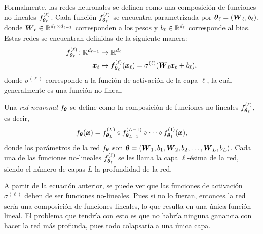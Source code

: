 {{%



Formalmente, las redes neuronales se definen como una composición de funciones no-lineales $f^{(\ell)}_{\vb*{\theta}_\ell}$. Cada función $f^{(\ell)}_{\vb*{\theta}_\ell}$ se encuentra parametrizada por $\vb*{\theta}_\ell = (\vb*{W}_\ell, b_\ell)$, donde $\vb*{W}_\ell \in \mathbb{R}^{d_{\ell} \times d_{\ell-1}}$ corresponden a los pesos y $b_\ell \in \mathbb{R}^{d_\ell}$ corresponde al bias. Estas redes se encuentran definidas de la siguiente manera:
\begin{align*}
    f^{(\ell)}_{\vb*{\theta}_\ell} \colon \mathbb{R}^{d_{\ell-1}} & \to \mathbb{R}^{d_\ell}                                                                         \\
    \vb*{x}_\ell                                      & \mapsto f^{(\ell)}_{\vb*{\theta}_\ell}(\vb*{x}_\ell) = \sigma^{(\ell)}(\vb*{W}_\ell \vb*{x}_\ell + b_\ell),
\end{align*}
donde $\sigma^{(\ell)}$ corresponde a la función de activación de la capa $\ell$, la cuál generalmente es una función no-lineal.

Una \emph{red neuronal} $f_{\vb*{\theta}}$ se define como la composición de funciones no-lineales $f^{(\ell)}_{\vb*{\theta}_{\ell}}$,
es decir,
\begin{equation}
    f_{\vb*{\theta}}(\vb*{x}) = f^{(L)}_{\vb*{\theta}_{L}} \circ f^{(L-1)}_{\vb*{\theta}_{L-1}} \circ \cdots \circ f^{(1)}_{\vb*{\theta}_{1}}(\vb*{x}),
\end{equation}
donde los parámetros de la red $f_{\vb*{\theta}}$ son $\vb*{\theta} = (\vb*{W}_1, b_1, \vb*{W}_2, b_2, \ldots, \vb*{W}_L, b_L)$. Cada una de las funciones no-lineales $f^{(\ell)}_{\vb*{\theta}_{\ell}}$ se les llama la capa $\ell$-ésima de la red, siendo el número de capas $L$ la profundidad de la red.

A partir de la ecuación anterior, se puede ver que las funciones de activación $\sigma^{(\ell)}$ deben de ser funciones no-lineales. Pues si no lo fueran, entonces la red sería una composición de funciones lineales, lo que resulta en una única función lineal. El problema que tendría con esto es que no habría ninguna ganancia con hacer la red más profunda, pues todo colapsaría a una única capa.

}}
